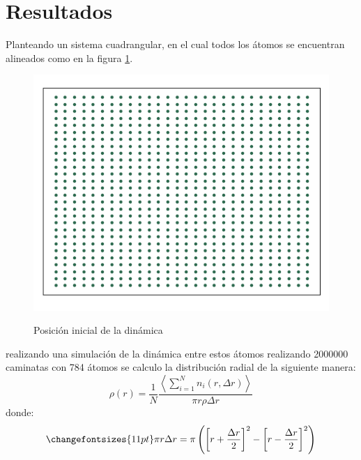 \documentclass[reprint,amsmath,amssymb,aps,]{revtex4-2}
\begin{document}
\section{Resultados}
Planteando un sistema cuadrangular, en el cual todos los átomos se encuentran alineados como en la figura \ref{pos inicial}.
\begin{figure}[H]
    \hspace*{-0.5cm}
    \includegraphics[scale=0.4]{../Graphics/Cor_in.png}\\
    \caption{Posición inicial de la dinámica}
    \label{pos inicial}
\end{figure}
realizando una simulación de la dinámica entre estos átomos realizando 2000000 caminatas con 784 átomos se calculo la distribución radial de la siguiente manera:
\begin{equation}
    \rho(r) = \frac{1}{N} \frac{\left\langle \sum_{i=1}^N n_i(r,\Delta r)  \right\rangle}{\pi r \rho \Delta r}
    \label{eq:rhor}
\end{equation}
donde:
\begin{equation}
    \changefontsizes{11pt}
    \label{eq:area}
    \pi r \Delta r = \pi \left(\left[r +\frac{\Delta r}{2}\right]^2 - \left[r- \frac{\Delta r}{2} \right]^2 \right)
\end{equation}
\end{document}
